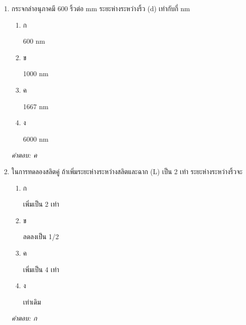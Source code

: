 \documentclass[12pt]{article}
\begin{document}
\begin{enumerate}[label=\arabic*., itemsep=0.5\baselineskip, topsep=0.5\baselineskip, leftmargin=*]
\item กระจกลำอนุภาคมี 600 ริ้วต่อ mm ระยะห่างระหว่างริ้ว (d) เท่ากับกี่ nm
\begin{enumerate}[label=\alph*)., itemsep=0.3\baselineskip, topsep=0.3\baselineskip]
\item ก\ 
\begin{minipage}[t]{0.9\linewidth}
\raggedright 600 nm
\end{minipage}
\item ข\ 
\begin{minipage}[t]{0.9\linewidth}
\raggedright 1000 nm
\end{minipage}
\item ค\ 
\begin{minipage}[t]{0.9\linewidth}
\raggedright 1667 nm
\end{minipage}
\item ง\ 
\begin{minipage}[t]{0.9\linewidth}
\raggedright 6000 nm
\end{minipage}
\end{enumerate}
\vspace{-0.3\baselineskip}
\begin{small}
\textit{คำตอบ: ค}
\end{small}

\item ในการทดลองสลิตคู่ ถ้าเพิ่มระยะห่างระหว่างสลิตและฉาก (L) เป็น 2 เท่า ระยะห่างระหว่างริ้วจะ
\begin{enumerate}[label=\alph*)., itemsep=0.3\baselineskip, topsep=0.3\baselineskip]
\item ก\ 
\begin{minipage}[t]{0.9\linewidth}
\raggedright เพิ่มเป็น 2 เท่า
\end{minipage}
\item ข\ 
\begin{minipage}[t]{0.9\linewidth}
\raggedright ลดลงเป็น 1/2
\end{minipage}
\item ค\ 
\begin{minipage}[t]{0.9\linewidth}
\raggedright เพิ่มเป็น 4 เท่า
\end{minipage}
\item ง\ 
\begin{minipage}[t]{0.9\linewidth}
\raggedright เท่าเดิม
\end{minipage}
\end{enumerate}
\vspace{-0.3\baselineskip}
\begin{small}
\textit{คำตอบ: ก}
\end{small}


\end{enumerate}
\end{document}
